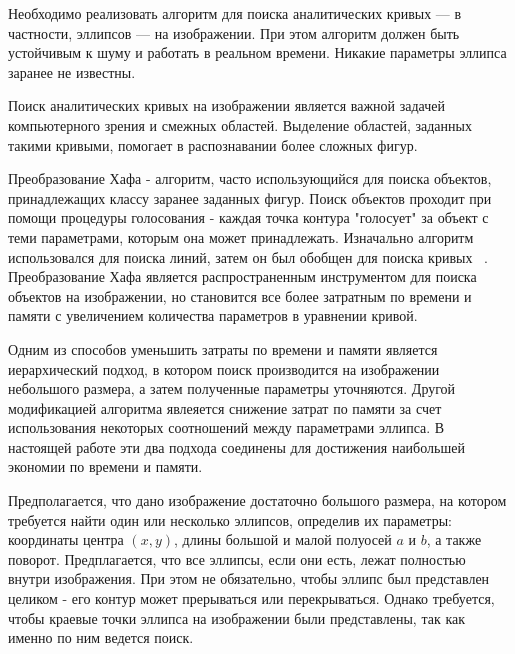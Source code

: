 




\Task
Необходимо реализовать алгоритм для поиска аналитических кривых — в частности, эллипсов — на изображении.
При этом алгоритм должен быть устойчивым к шуму и работать в реальном времени.
Никакие параметры эллипса заранее не известны.

\Intro

Поиск аналитических кривых на изображении является важной задачей компьютерного зрения и смежных областей. Выделение областей, заданных такими кривыми, помогает в распознавании более сложных фигур.

Преобразование Хафа - алгоритм, часто использующийся для поиска объектов, принадлежащих классу заранее заданных фигур. 
Поиск объектов проходит при помощи процедуры голосования - каждая точка контура "голосует" за объект с теми параметрами, которым она может принадлежать. 
Изначально алгоритм использовался для поиска линий, затем он был обобщен для поиска кривых ~\autocite{Duda}.
Преобразование Хафа является распространенным инструментом для поиска объектов на изображении, но становится все более затратным по времени и памяти с увеличением количества параметров в уравнении кривой.

Одним из способов уменьшить затраты по времени и памяти является иерархический подход, в котором поиск производится на изображении небольшого размера, а затем полученные параметры уточняются. 
Другой модификацией алгоритма явлеяется снижение затрат по памяти за счет использования некоторых соотношений между параметрами эллипса.
В настоящей работе эти два подхода соединены для достижения наибольшей экономии по времени и памяти.

Предполагается, что дано изображение достаточно большого размера, на котором требуется найти один или несколько эллипсов, определив их параметры: 
координаты центра \((x, y)\), длины большой и малой полуосей \(a\) и \(b\), а также поворот. Предплагается, что все эллипсы, если они есть, лежат 
полностью внутри изображения. При этом не обязательно, чтобы эллипс был представлен целиком - его контур может прерываться или перекрываться. 
Однако требуется, чтобы краевые точки эллипса на изображении были представлены, так как именно по ним ведется поиск.  

